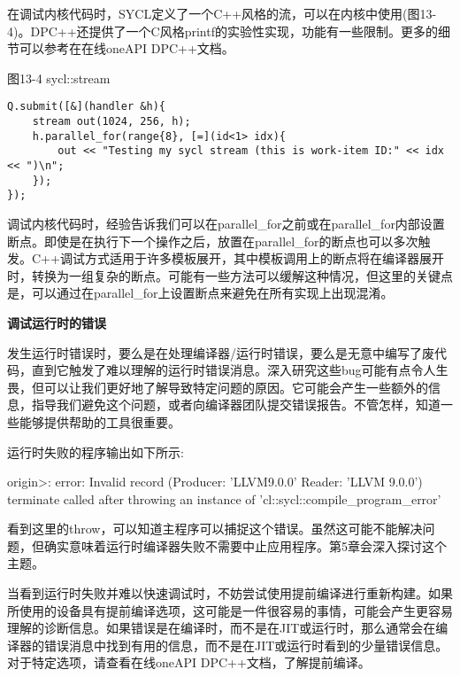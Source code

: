 在调试内核代码时，SYCL定义了一个C++风格的流，可以在内核中使用(图13-4)。DPC++还提供了一个C风格printf的实验性实现，功能有一些限制。更多的细节可以参考在在线oneAPI DPC++文档。\par

\hspace*{\fill} \par %
图13-4 sycl::stream
\begin{lstlisting}[caption={}]
Q.submit([&](handler &h){
	stream out(1024, 256, h);
	h.parallel_for(range{8}, [=](id<1> idx){
		out << "Testing my sycl stream (this is work-item ID:" << idx << ")\n";
	});
});
\end{lstlisting}

调试内核代码时，经验告诉我们可以在parallel\_for之前或在parallel\_for内部设置断点。即使是在执行下一个操作之后，放置在parallel\_for的断点也可以多次触发。C++调试方式适用于许多模板展开，其中模板调用上的断点将在编译器展开时，转换为一组复杂的断点。可能有一些方法可以缓解这种情况，但这里的关键点是，可以通过在parallel\_for上设置断点来避免在所有实现上出现混淆。\par

\hspace*{\fill} \par %
\textbf{调试运行时的错误}

发生运行时错误时，要么是在处理编译器/运行时错误，要么是无意中编写了废代码，直到它触发了难以理解的运行时错误消息。深入研究这些bug可能有点令人生畏，但可以让我们更好地了解导致特定问题的原因。它可能会产生一些额外的信息，指导我们避免这个问题，或者向编译器团队提交错误报告。不管怎样，知道一些能够提供帮助的工具很重要。\par

运行时失败的程序输出如下所示:\par

\begin{tcolorbox}[colback=white,colframe=black]
origin>: error: Invalid record (Producer: 'LLVM9.0.0' Reader: 'LLVM 9.0.0')\\
terminate called after throwing an instance of 'cl::sycl::compile\_program\_error'
\end{tcolorbox}

看到这里的throw，可以知道主程序可以捕捉这个错误。虽然这可能不能解决问题，但确实意味着运行时编译器失败不需要中止应用程序。第5章会深入探讨这个主题。\par

当看到运行时失败并难以快速调试时，不妨尝试使用提前编译进行重新构建。如果所使用的设备具有提前编译选项，这可能是一件很容易的事情，可能会产生更容易理解的诊断信息。如果错误是在编译时，而不是在JIT或运行时，那么通常会在编译器的错误消息中找到有用的信息，而不是在JIT或运行时看到的少量错误信息。对于特定选项，请查看在线oneAPI DPC++文档，了解提前编译。\par

